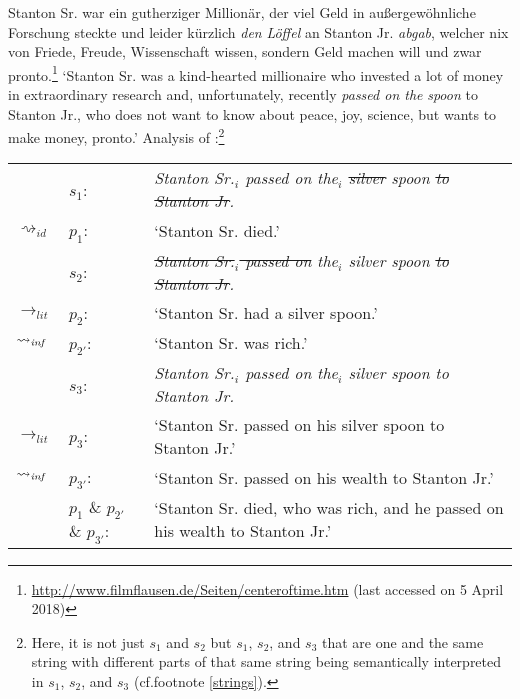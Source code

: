 \documentclass[output=paper]{langsci/langscibook}
\begin{document}
\ea \label{silver spoon}
Stanton Sr. war ein gutherziger Millionär, der viel Geld in außergewöhnliche Forschung steckte und leider kürzlich \textit{den} \underline{} \textit{Löffel} an Stanton Jr. \textit{abgab}, welcher nix von Friede, Freude, Wissenschaft wissen, sondern Geld machen will und zwar pronto.\footnote{\url{http://www.filmflausen.de/Seiten/centeroftime.htm} (last accessed on 5 April 2018)}
\glt `Stanton Sr. was a kind-hearted millionaire who invested a lot of money in extraordinary research and, unfortunately, recently \textit{passed on the} \underline{} \textit{spoon} to Stanton Jr., who does not want to know about peace, joy, science, but wants to make money, pronto.'
\ex \label{analysis silver spoon ++}
Analysis of :\footnote{Here, it is not just $s_{1}$ and $s_{2}$ but $s_{1}$, $s_{2}$, and $s_{3}$ that are one and the same string with different parts of that same string being semantically interpreted in $s_{1}$, $s_{2}$, and $s_{3}$ (cf.\@ footnote \ref{strings}).}\smallskip\\
\begin{tabularx}{\linewidth}[t]{@{}l@{\hspace{.5\tabcolsep}}l@{\hspace{.5\tabcolsep}}Q@{}}
& 	$s_{1}$: & \textit{Stanton Sr.$_{i}$ passed on the$_{i}$ \sout{silver} spoon \sout{to Stanton Jr}.} \\
$\rightsquigarrow_{id}$	&	$p_{1}$: & `Stanton Sr. died.'\medskip\\
                    & 	$s_{2}$: & \textit{\sout{Stanton Sr.$_{i}$ passed on} the$_{i}$ silver spoon \sout{to Stanton Jr}.}\\
$\rightarrow_{lit}$ &	$p_{2}$: & `Stanton Sr. had a silver spoon.' \\
$\rightsquigarrow_{\text{\itshape inf}}$	&	$p_{2'}$: & `Stanton Sr. was rich.'\medskip\\
                    & 	$s_{3}$: & \textit{Stanton Sr.$_{i}$ passed on the$_{i}$ silver spoon to Stanton Jr.} \\
$\rightarrow_{lit}$	&	$p_{3}$: & `Stanton Sr. passed on his silver spoon to Stanton Jr.' \\
$\rightsquigarrow_{\text{\itshape inf}}$	&	$p_{3'}$: & `Stanton Sr. passed on his wealth to Stanton Jr.'\medskip\\
 &	$p_{1}$ \& $p_{2'}$ \& $p_{3'}$: & `Stanton Sr. died, who was rich, and he passed on his wealth to Stanton Jr.'\\
\end{tabularx}
\z
\end{document}
